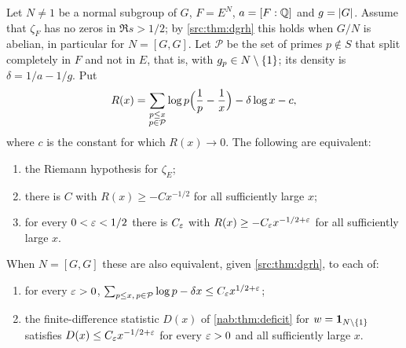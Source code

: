 \begin{theorem}\label{nab:thm:nonsplit}
Let $N\ne1$ be a normal subgroup of $G$, $F=E^N$, $a=[F:\mathbb{Q}]$ and $g=\lvert G\rvert$. Assume that
$\zeta_F$ has no zeros in $\Re s>1/2$; by \cref{src:thm:dgrh} this holds when $G/N$ is
abelian, in particular for $N=[G,G]$. Let $\mathcal P$ be the set of primes $p\notin S$
that split completely in $F$ and not in $E$, that is, with $g_p\in N\setminus\{1\}$; its
density is $\delta=1/a-1/g$. Put
\[
 R(x)=\sum_{\substack{p\le x\\p\in\mathcal P}}\log p\Bigl(\frac1p-\frac1x\Bigr)-\delta\log x-c,
\]
where $c$ is the constant for which $R(x)\to0$. The following are equivalent:
\begin{enumerate}[label=\textup{(\roman*)}]
\item the Riemann hypothesis for $\zeta_E$;
\item there is $C$ with $R(x)\ge-Cx^{-1/2}$ for all sufficiently large $x$;
\item for every $0<\varepsilon<1/2$ there is $C_\varepsilon$ with $R(x)\ge-C_\varepsilon x^{-1/2+\varepsilon}$ for all
sufficiently large $x$.
\end{enumerate}
When $N=[G,G]$ these are also equivalent, given \cref{src:thm:dgrh}, to each of:
\begin{enumerate}[label=\textup{(\roman*)},resume]
\item for every $\varepsilon>0$,
$\sum_{p\le x,\,p\in\mathcal P}\log p-\delta x\le C_\varepsilon x^{1/2+\varepsilon}$;
\item the finite-difference statistic $D(x)$ of \cref{nab:thm:deficit} for
$w=\mathbf{1}_{N\setminus\{1\}}$ satisfies $D(x)\le C_\varepsilon x^{-1/2+\varepsilon}$ for every $\varepsilon>0$
and all sufficiently large $x$.
\end{enumerate}
\end{theorem}
